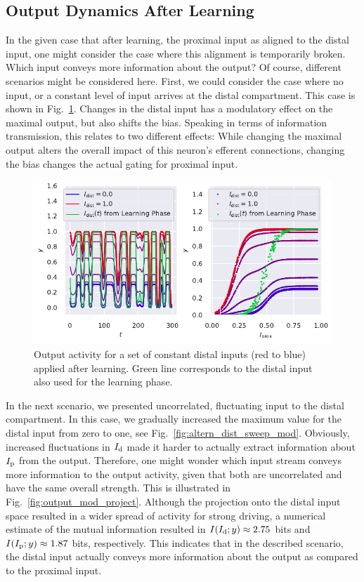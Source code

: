 \documentclass[10pt,a4paper,draft]{article}
\begin{document}
\subsection{Output Dynamics After Learning}
In the given case that after learning, the proximal input as aligned to the distal input, one might consider the case where this alignment is temporarily broken. Which input conveys more information about the output? Of course, different scenarios might be considered here. First, we could consider the case where no input, or a constant level of input arrives at the distal compartment. This case is shown in Fig.~\ref{fig:const_dist_sweep_mod}. Changes in the distal input has a modulatory effect on the maximal output, but also shifts the bias. Speaking in terms of information transmission, this relates to two different effects: While changing the maximal output alters the overall impact of this neuron's efferent connections, changing the bias changes the actual gating for proximal input. 
\begin{figure}
	\centering
	\includegraphics[width=\textwidth]{./figures/output_modulation_sweep.pdf}
	\caption{Output activity for a set of constant distal inputs (red to blue) applied after learning. Green line corresponds to the distal input also used for the learning phase.}
	\label{fig:const_dist_sweep_mod}
\end{figure}
In the next scenario, we presented uncorrelated, fluctuating input to the distal compartment. In this case, we gradually increased the maximum value for the distal input from zero to one, see Fig.~\ref{fig:altern_dist_sweep_mod}. Obviously, increased fluctuations in $I_{\rm d}$ made it harder to actually extract information about $I_{\rm p}$ from the output. Therefore, one might wonder which input stream conveys more information to the output activity, given that both are uncorrelated and have the same overall strength. This is illustrated in Fig.~\ref{fig:output_mod_project}. Although the projection onto the distal input space resulted in a wider spread of activity for strong driving, a numerical estimate of the mutual information resulted in $I(I_{\rm d};y) \approx 2.75$ bits and $I(I_{\rm p};y) \approx 1.87$ bits, respectively. This indicates that in the described scenario, the distal input actually conveys more information about the output as compared to the proximal input.
\end{document}

